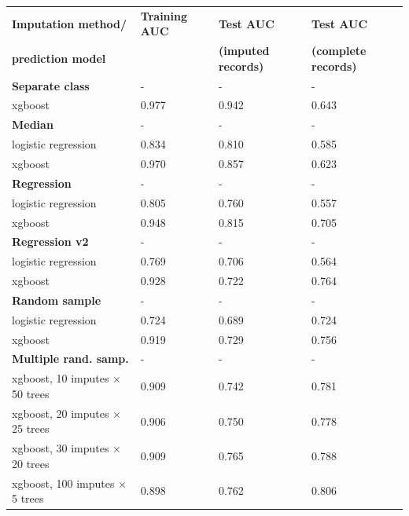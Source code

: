 \documentclass[12pt]{article}
\begin{document}
\begin{center}
\begin{tabular}{|l|l|l|l|}
\hline
\textbf{Imputation method/} & \textbf{Training AUC} & \textbf{Test AUC} & \textbf{Test AUC} \\
\textbf{prediction model}& & \textbf{(imputed records)} & \textbf{(complete records)} \\ \hline
{\bf Separate class} & - & - & - \\ \hline
xgboost & 0.977 & 0.942 & 0.643 \\ \hline
{\bf Median} & - & - & - \\ \hline
logistic regression & 0.834 & 0.810 & 0.585 \\ \hline
xgboost & 0.970 & 0.857 & 0.623 \\ \hline
{\bf Regression} & - & - & - \\ \hline
logistic regression & 0.805 & 0.760 & 0.557 \\ \hline
xgboost & 0.948 & 0.815 & 0.705 \\ \hline
{\bf Regression v2} & - & - & - \\ \hline
logistic regression & 0.769 & 0.706 & 0.564 \\ \hline
xgboost & 0.928 & 0.722 & 0.764 \\ \hline
{\bf Random sample} & - & - & - \\ \hline
logistic regression & 0.724 & 0.689 & 0.724 \\ \hline
xgboost & 0.919 & 0.729 & 0.756 \\ \hline
{\bf Multiple rand. samp.} & - & - & - \\ \hline
xgboost, 10 imputes $\times$ 50 trees & 0.909 & 0.742 & 0.781 \\ \hline
xgboost, 20 imputes $\times$ 25 trees & 0.906 & 0.750 & 0.778 \\ \hline
xgboost, 30 imputes $\times$ 20 trees & 0.909 & 0.765 & 0.788 \\ \hline
xgboost, 100 imputes $\times$ 5 trees & 0.898 & 0.762 & 0.806 \\ \hline
\end{tabular}
\end{center}

\end{document}
